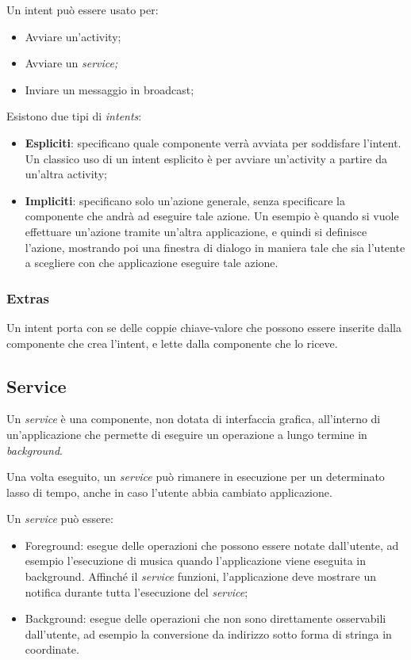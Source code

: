 Un intent può essere usato per:

\begin{itemize}
    \item Avviare un'activity;
    \item Avviare un \emph{service;}
    \item Inviare un messaggio in broadcast;
\end{itemize}
Esistono due tipi di \emph{intents}:

\begin{itemize}
    \item \textbf{Espliciti}: specificano quale componente verrà avviata per soddisfare l'intent. Un classico uso di un intent esplicito è per avviare un'activity a partire da un'altra activity;
    \item \textbf{Impliciti}: specificano solo un'azione generale, senza specificare la componente che andrà ad eseguire tale azione. Un esempio è quando si vuole effettuare un'azione tramite un'altra applicazione, e quindi si definisce l'azione, mostrando poi una finestra di dialogo in maniera tale che sia l'utente a scegliere con che applicazione eseguire tale azione.
\end{itemize}
\hypertarget{extras}{%
\subsubsection{Extras}\label{extras}}

Un intent porta con se delle coppie chiave-valore che possono essere inserite dalla componente che crea l'intent, e lette dalla componente che lo riceve.

\hypertarget{service}{%
\subsection{Service}\label{service}}

Un \emph{service} è una componente, non dotata di interfaccia grafica, all'interno di un'applicazione che permette di eseguire un operazione a lungo termine in \emph{background}. \cite{services}

Una volta eseguito, un \emph{service} può rimanere in esecuzione per un determinato lasso di tempo, anche in caso l'utente abbia cambiato applicazione.

Un \textit{service} può essere:
\begin{itemize}
    \item Foreground: esegue delle operazioni che possono essere notate dall'utente, ad esempio l'esecuzione di musica quando l'applicazione viene eseguita in background. Affinché il \textit{service} funzioni, l'applicazione deve mostrare un notifica durante tutta l'esecuzione del \textit{service};
    \item Background: esegue delle operazioni che non sono direttamente osservabili dall'utente, ad esempio la conversione da indirizzo sotto forma di stringa in coordinate.
\end{itemize}


